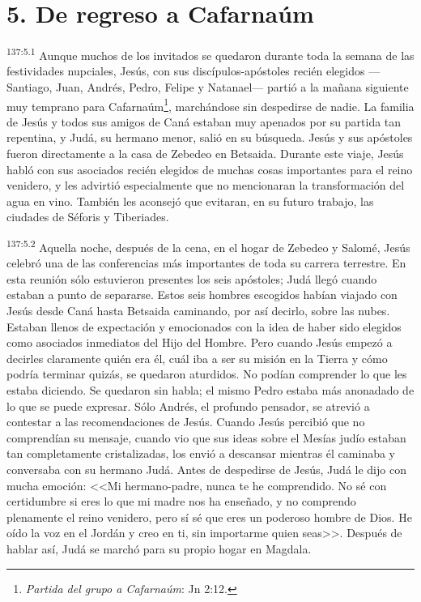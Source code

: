\section*{5. De regreso a Cafarnaúm}
\par 
\textsuperscript{137:5.1} Aunque muchos de los invitados se quedaron durante toda la semana de las festividades nupciales, Jesús, con sus discípulos-apóstoles recién elegidos ---Santiago, Juan, Andrés, Pedro, Felipe y Natanael--- partió a la mañana siguiente muy temprano para Cafarnaúm\footnote{\textit{Partida del grupo a Cafarnaúm}: Jn 2:12.}, marchándose sin despedirse de nadie. La familia de Jesús y todos sus amigos de Caná estaban muy apenados por su partida tan repentina, y Judá, su hermano menor, salió en su búsqueda. Jesús y sus apóstoles fueron directamente a la casa de Zebedeo en Betsaida. Durante este viaje, Jesús habló con sus asociados recién elegidos de muchas cosas importantes para el reino venidero, y les advirtió especialmente que no mencionaran la transformación del agua en vino. También les aconsejó que evitaran, en su futuro trabajo, las ciudades de Séforis y Tiberiades.

\par 
\textsuperscript{137:5.2} Aquella noche, después de la cena, en el hogar de Zebedeo y Salomé, Jesús celebró una de las conferencias más importantes de toda su carrera terrestre. En esta reunión sólo estuvieron presentes los seis apóstoles; Judá llegó cuando estaban a punto de separarse. Estos seis hombres escogidos habían viajado con Jesús desde Caná hasta Betsaida caminando, por así decirlo, sobre las nubes. Estaban llenos de expectación y emocionados con la idea de haber sido elegidos como asociados inmediatos del Hijo del Hombre. Pero cuando Jesús empezó a decirles claramente quién era él, cuál iba a ser su misión en la Tierra y cómo podría terminar quizás, se quedaron aturdidos. No podían comprender lo que les estaba diciendo. Se quedaron sin habla; el mismo Pedro estaba más anonadado de lo que se puede expresar. Sólo Andrés, el profundo pensador, se atrevió a contestar a las recomendaciones de Jesús. Cuando Jesús percibió que no comprendían su mensaje, cuando vio que sus ideas sobre el Mesías judío estaban tan completamente cristalizadas, los envió a descansar mientras él caminaba y conversaba con su hermano Judá. Antes de despedirse de Jesús, Judá le dijo con mucha emoción: <<Mi hermano-padre, nunca te he comprendido. No sé con certidumbre si eres lo que mi madre nos ha enseñado, y no comprendo plenamente el reino venidero, pero sí sé que eres un poderoso hombre de Dios. He oído la voz en el Jordán y creo en ti, sin importarme quien seas>>. Después de hablar así, Judá se marchó para su propio hogar en Magdala.

